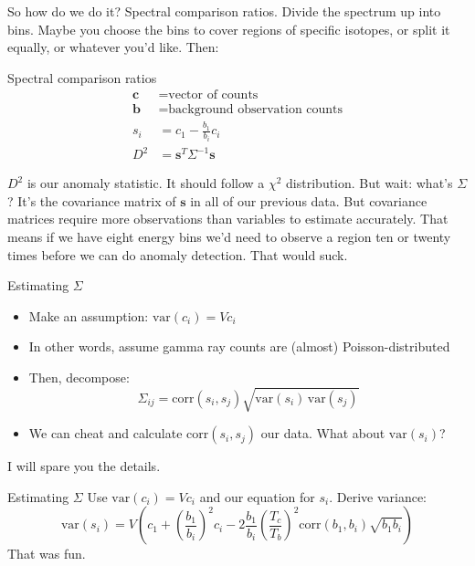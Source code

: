 \documentclass[ignorenonframetext]{beamer}
\begin{document}
So how do we do it? Spectral comparison ratios. Divide the spectrum up into
bins. Maybe you choose the bins to cover regions of specific isotopes, or split
it equally, or whatever you'd like. Then:

\begin{frame}{Spectral comparison ratios}
  \begin{align*}
    \mathbf{c} &= \text{vector of counts}\\
    \mathbf{b} &= \text{background observation counts}\\
    s_i &= c_1 - \frac{b_1}{b_i} c_i\\
    D^2 &= \mathbf{s}^T \Sigma^{-1} \mathbf{s}
  \end{align*}
\end{frame}

\(D^2\) is our anomaly statistic. It should follow a \(\chi^2\)
distribution. But wait: what's \(\Sigma\)? It's the covariance matrix of
\(\mathbf{s}\) in all of our previous data. But covariance matrices require more
observations than variables to estimate accurately. That means if we have eight
energy bins we'd need to observe a region ten or twenty times before we can do
anomaly detection. That would suck.

\begin{frame}{Estimating \(\Sigma\)}
  \begin{itemize}
    \item Make an assumption: \(\text{var}(c_i) = V c_i\)
    \item In other words, assume gamma ray counts are (almost)
      Poisson-distributed
    \item Then, decompose:
      \begin{equation*}
        \Sigma_{ij} = \text{corr}(s_i, s_j) \sqrt{\text{var}(s_i)\, \text{var}(s_j)}
      \end{equation*}
    \item We can cheat and calculate \(\text{corr}(s_i, s_j)\) our data. What
      about \(\text{var}(s_i)\)?
  \end{itemize}
\end{frame}

I will spare you the details.

\begin{frame}{Estimating \(\Sigma\)}
  Use \(\text{var}(c_i) = V c_i\) and our equation for \(s_i\). Derive variance:
  \begin{equation*}
    \text{var}(s_i) = V \left(c_1 + \left(\frac{b_1}{b_i}\right)^2 c_i -
      2\frac{b_1}{b_i} \left(\frac{T_c}{T_b}\right)^2 \text{corr}(b_1, b_i)
      \sqrt{b_1 b_i}\right)
  \end{equation*}
  That was fun.
\end{frame}
\end{document}
